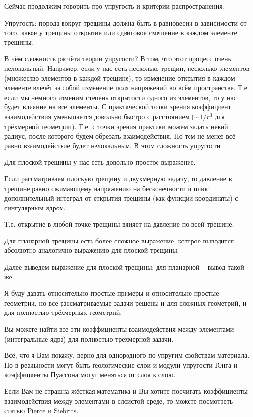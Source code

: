 \documentclass[main.tex]{subfiles}
\begin{document}
Сейчас продолжим говорить про упругость и критерии распространения.

Упругость: порода вокруг трещины должна быть в равновесии в зависимости от того, какое у трещины открытие или сдвиговое смещение в каждом элементе трещины.

В чём сложность расчёта теории упругости? В том, что этот процесс очень нелокальный.
Например, если у нас есть несколько трещин, несколько элементов (множество элементов в каждой трещине), то изменение открытия в каждом элементе влечёт за собой изменение поля напряжений во всём пространстве.
Т.е. если мы немного изменим степень открытости одного из элементов, то у нас будет влияние на все элементы.
С практической точки зрения коэффициент взаимодействия уменьшается довольно быстро с расстоянием ($\sim 1/r^3$ для трёхмерной геометрии).
Т.е. с точки зрения практики можем задать некий радиус, после которого будем обрезать взаимодействия.
Но тем не менее всё равно взаимодействие будет нелокальным.
В этом сложность упругости.


Для плоской трещины у нас есть довольно простое выражение.

Если рассматриваем плоскую трещину и двухмерную задачу, то давление в трещине равно сжимающему напряжению на бесконечности и плюс дополнительный интеграл от открытия трещины (как функции координаты) с сингулярным ядром.

Т.е. открытие в любой точке трещины влияет на давление по всей трещине.


Для планарной трещины есть более сложное выражение, которое выводится абсолютно аналогично выражению для плоской трещины.

Далее выведем выражение для плоской трещины; для планарной -- вывод такой же.


Я буду давать относительно простые примеры и относительно простые геометрии, но все рассматриваемые задачи решены и для сложных геометрий, и для полностью трёхмерных геометрий.

Вы можете найти все эти коэффициенты взаимодействия между элементами (интегральные ядра) для полностью трёхмерной задачи.

Всё, что я Вам покажу, верно для однородного по упругим свойствам материала.
Но в реальности могут быть геологические слои и модули упругости Юнга и коэффициенты Пуассона могут меняться от слоя к слою.

Если Вам не страшна жёсткая математика и Вы хотите посчитать коэффициенты взаимодействия между элементами в слоистой среде, то можете посмотреть статью Pierce и Siebrits.
\end{document}
